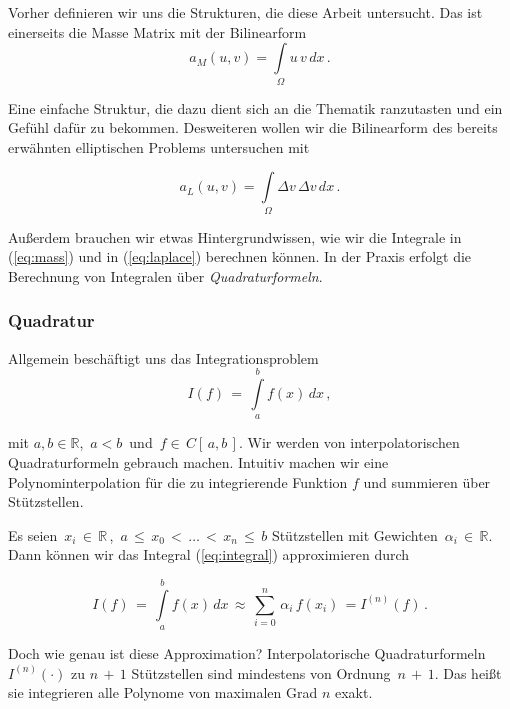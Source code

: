 Vorher definieren wir uns die Strukturen, die diese Arbeit untersucht. Das ist einerseits die Masse Matrix mit der Bilinearform
\begin{equation} \label{eq:mass}
a_M(u,v)= \int\limits_{\Omega} u \, v \, dx \, .
\end{equation}

Eine einfache Struktur, die dazu dient sich an die Thematik ranzutasten und ein Gefühl dafür zu bekommen. Desweiteren wollen wir die Bilinearform des bereits erwähnten elliptischen Problems untersuchen mit

\begin{equation} \label{eq:laplace}
a_L(u,v) = \int\limits_{\Omega} \Delta v \, \Delta v \, dx \, .
\end{equation}

Außerdem brauchen wir etwas Hintergrundwissen, wie wir die Integrale in (\ref{eq:mass}) und in (\ref{eq:laplace}) berechnen können. In der Praxis erfolgt die Berechnung von Integralen über   \textit{Quadraturformeln}.

\subsubsection{Quadratur}

Allgemein beschäftigt uns das Integrationsproblem
\begin{equation} \label{eq:integral}
I(f) \, = \, \int\limits_{a}^{b} f(x) \, dx \, ,
\end{equation}

mit $a,b \in \mathbb{R}$, $\, a < b \, $ und $\, f \in \, C[ \, a,b \, ] $.
Wir werden von interpolatorischen Quadraturformeln gebrauch machen. Intuitiv machen wir eine Polynominterpolation für die zu integrierende Funktion $f$ und summieren über Stützstellen.

Es seien $\, x_i \, \in \, \mathbb{R} \,$, $\, a \, \leq \, x_0 \, < \, \dots \, < \, x_n \, \leq \, b$ Stützstellen mit Gewichten $\, \alpha_i \, \in \, \mathbb{R}$. Dann können wir das Integral (\ref{eq:integral}) approximieren durch

\begin{equation} \label{eq:integral}
I(f) \, = \, \int\limits_{a}^{b} f(x) \, dx \, \approx \, \sum\limits_{i=0}^{n} \, \alpha_i \, f(x_i) \, = I^{(n)}(f) \, .
\end{equation}

Doch wie genau ist diese Approximation? Interpolatorische Quadraturformeln $I^{(n)}(\cdot)$ zu $n \, + \, 1$ Stützstellen sind mindestens von Ordnung $\, n \, + \,1$. Das heißt sie integrieren alle Polynome von maximalen Grad $n$ exakt.

